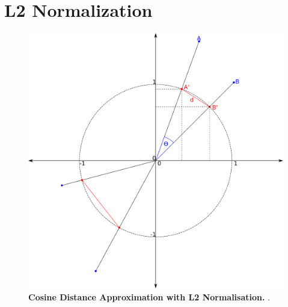 \section{L2 Normalization} \label{sec:2.4}

\begin{figure}[!hbt]
    \includegraphics[width=\dimexpr\textwidth-2\fboxsep-2\fboxrule,fbox]{Extra_Graphics/L2_Euclidean.pdf}
    \caption[Cosine Distance Approximation with L2 Normalisation]{\textbf{Cosine Distance Approximation with L2 Normalisation.} .}
    \label{fig:2.4.1}
\end{figure}

\blindtext


